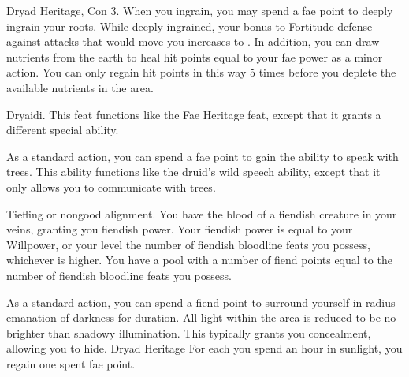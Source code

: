     \featpres Dryad Heritage, Con 3.
    \featben When you ingrain, you may spend a fae point to deeply ingrain your roots. While deeply ingrained, your bonus to Fortitude defense against attacks that would move you increases to . In addition, you can draw nutrients from the earth to heal hit points equal to your fae power as a minor action. You can only regain hit points in this way 5 times before you deplete the available nutrients in the area.

    \featpre Dryaidi.
    \featben This feat functions like the Fae Heritage feat, except that it grants a different special ability.

    As a standard action, you can spend a fae point to gain the ability to speak with trees. This ability functions like the druid's wild speech ability, except that it only allows you to communicate with trees.

    \featpre Tiefling or nongood alignment.
    \featben You have the blood of a fiendish creature in your veins, granting you fiendish power.
    Your fiendish power is equal to your Willpower, or your level \add the number of fiendish bloodline feats you possess, whichever is higher.
    You have a pool with a number of fiend points equal to the number of fiendish bloodline feats you possess.

    As a standard action, you can spend a fiend point to surround yourself in \areamed radius emanation of darkness for \durshort duration.
    All light within the area is reduced to be no brighter than shadowy illumination.
    This typically grants you concealment, allowing you to hide.
    \featpre Dryad Heritage
    \featben For each you spend an hour in sunlight, you regain one spent fae point.
